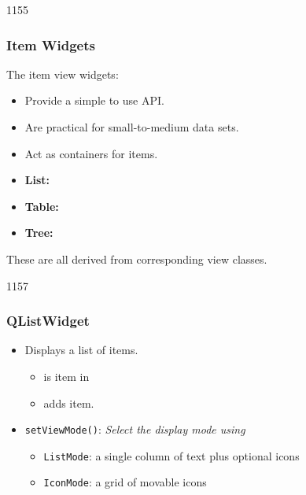 \begin{slide}[fragile]{1155}\frametitle{Item Widgets}
  \label{introduction_to_model_view_widgets}

The item view widgets:

\begin{itemize}
\item Provide a simple to use API.
\item Are practical for small-to-medium data sets.
\item Act as containers for items.
\end{itemize}

\begin{itemize}
\item \textbf{List:} 
\item \textbf{Table:} 
\item \textbf{Tree:} 
\end{itemize}

These are all derived from corresponding view classes.
\end{slide}

\begin{slide}{1157}\frametitle{QListWidget}

\begin{itemize}
 \item Displays a list of items.
   \begin{itemize}
   \item {} is item in 
   \item {} adds item.
   \end{itemize}
 \item  \texttt{setViewMode()}: \textit{Select the display mode using}
   \begin{itemize}
   \item \texttt{ListMode}: a single column of text plus optional icons
   \item \texttt{IconMode}: a grid of movable icons
   \end{itemize}
   \end{itemize}
\vfill
\hfill{}\hfill{}\hfill\strut

\end{slide}

